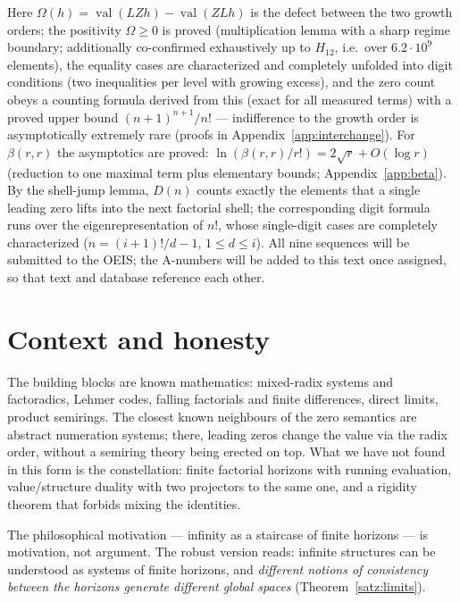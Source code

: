 \documentclass[11pt]{article}
\theoremstyle{definition}
\theoremstyle{remark}
\newcommand{\val}{\operatorname{val}}
\begin{document}
Here $\Omega(h)=\val(LZh)-\val(ZLh)$ is the defect between the two
growth orders; the positivity $\Omega\ge0$ is proved
(multiplication lemma with a sharp regime boundary; additionally
co-confirmed exhaustively up to $H_{12}$, i.e.\ over
$6.2\cdot10^9$ elements), the
equality cases are characterized and completely unfolded into digit
conditions (two inequalities per level with growing excess), and
the zero count obeys a counting formula derived from this (exact
for all measured terms) with a proved upper bound
$(n{+}1)^{n+1}/n!$ — indifference to the growth order is
asymptotically extremely rare
(proofs in Appendix~\ref{app:interchange}). For
$\beta(r,r)$ the asymptotics are proved:
$\ln(\beta(r,r)/r!)=2\sqrt r+O(\log r)$ (reduction to one maximal
term plus elementary bounds; Appendix~\ref{app:beta}). By the shell-jump lemma, $D(n)$
counts exactly the elements that a single leading zero lifts into
the next factorial shell; the corresponding digit formula runs over
the eigenrepresentation of $n!$, whose single-digit cases are
completely characterized ($n=(i{+}1)!/d-1$, $1\le d\le i$). All
nine sequences will be submitted to the OEIS; the A-numbers will be
added to this text once assigned, so that text and database
reference each other.

\section{Context and honesty}

The building blocks are known mathematics: mixed-radix systems and
factoradics, Lehmer codes, falling factorials and finite
differences, direct limits, product semirings. The closest known
neighbours of the zero semantics are abstract numeration systems;
there, leading zeros change the value via the radix order, without
a semiring theory being erected on top. What we have not found in
this form is the constellation: finite factorial horizons with
running evaluation, value/structure duality with two projectors to
the same one, and a rigidity theorem that forbids mixing the
identities.

The philosophical motivation --- infinity as a staircase of finite
horizons --- is motivation, not argument. The robust version reads:
infinite structures can be understood as systems of finite
horizons, and \emph{different notions of consistency between the
horizons generate different global spaces}
(Theorem~\ref{satz:limits}).
\end{document}
